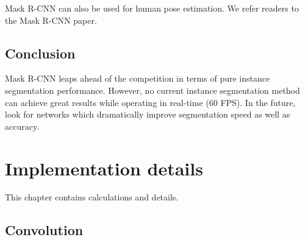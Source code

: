 \begin{figure}[htbp]
\begin{minipage}{0.65\textwidth}
	\end{minipage}
\end{figure}

Mask R-CNN can also be used for human pose estimation. We refer readers to the Mask R-CNN paper.

\subsection{Conclusion}
Mask R-CNN leaps ahead of the competition in terms of pure instance segmentation performance. However, no current instance segmentation method can achieve great results while operating in real-time (60 FPS). In the future, look for networks which dramatically improve segmentation speed as well as accuracy.



\section{Implementation details}\label{s:impl}

This chapter contains calculations and details.

\subsection{Convolution}\label{s:impl-convolution}

